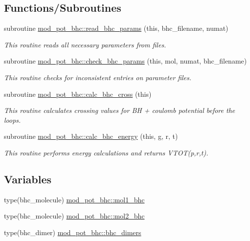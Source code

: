 \subsection*{Functions/\+Subroutines}
\begin{DoxyCompactItemize}
\item 
subroutine \hyperlink{namespacemod__pot__bhc_ab1ca15618078c0662d799fc22b126e17}{mod\+\_\+pot\+\_\+bhc\+::read\+\_\+bhc\+\_\+params} (this, bhc\+\_\+filename, numat)
\begin{DoxyCompactList}\small\item\em This routine reads all necessary parameters from files. \end{DoxyCompactList}\item 
subroutine \hyperlink{namespacemod__pot__bhc_a4fe10c812421f1de0a51b6fa227fcfd9}{mod\+\_\+pot\+\_\+bhc\+::check\+\_\+bhc\+\_\+params} (this, mol, numat, bhc\+\_\+filename)
\begin{DoxyCompactList}\small\item\em This routine checks for inconsistent entries on parameter files. \end{DoxyCompactList}\item 
subroutine \hyperlink{namespacemod__pot__bhc_af0819f829c162a751bfd89f7985103dc}{mod\+\_\+pot\+\_\+bhc\+::calc\+\_\+bhc\+\_\+cross} (this)
\begin{DoxyCompactList}\small\item\em This routine calculates crossing values for BH + coulomb potential before the loops. \end{DoxyCompactList}\item 
subroutine \hyperlink{namespacemod__pot__bhc_a4053339b84bceb793c404010f7735624}{mod\+\_\+pot\+\_\+bhc\+::calc\+\_\+bhc\+\_\+energy} (this, g, r, t)
\begin{DoxyCompactList}\small\item\em This routine performs energy calculations and returns V\+T\+O\+T(p,r,t). \end{DoxyCompactList}\end{DoxyCompactItemize}
\subsection*{Variables}
\begin{DoxyCompactItemize}
\item 
type(bhc\+\_\+molecule) \hyperlink{namespacemod__pot__bhc_a1624e56c037fde88375d7844e2846ab2}{mod\+\_\+pot\+\_\+bhc\+::mol1\+\_\+bhc}
\item 
type(bhc\+\_\+molecule) \hyperlink{namespacemod__pot__bhc_af61e65117b770d57d6ec81037ca6590b}{mod\+\_\+pot\+\_\+bhc\+::mol2\+\_\+bhc}
\item 
type(bhc\+\_\+dimer) \hyperlink{namespacemod__pot__bhc_a3fcd8470e5904559d0c2c3dd1a517d2d}{mod\+\_\+pot\+\_\+bhc\+::bhc\+\_\+dimers}
\end{DoxyCompactItemize}
